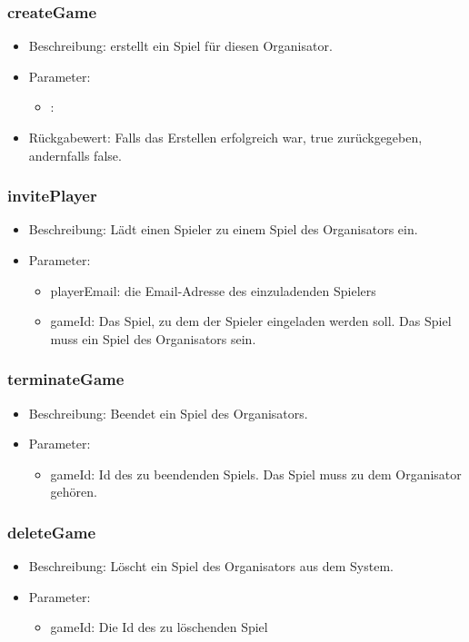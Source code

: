 \documentclass[a4paper]{scrreprt}
\begin{document}
	\subsubsection{createGame}
	\begin{itemize}
		\item Beschreibung: erstellt ein Spiel für diesen Organisator.
		\item Parameter: %
		\begin{itemize}
			\item :
		\end{itemize}
		\item Rückgabewert: Falls das Erstellen erfolgreich war, true zurückgegeben, andernfalls false. 
	\end{itemize}
	\subsubsection{invitePlayer}
	\begin{itemize}
		\item Beschreibung: Lädt einen Spieler zu einem Spiel des Organisators ein.
		\item Parameter:
		\begin{itemize}
			\item playerEmail: die Email-Adresse des einzuladenden Spielers
			\item gameId: Das Spiel, zu dem der Spieler eingeladen werden soll. Das Spiel muss ein Spiel des Organisators sein.
		\end{itemize}
	\end{itemize}
	\subsubsection{terminateGame}
	\begin{itemize}
		\item Beschreibung: Beendet ein Spiel des Organisators. 
		\item Parameter:
		\begin{itemize}
			\item gameId: Id des zu beendenden Spiels. Das Spiel muss zu dem Organisator gehören.
		\end{itemize}
	\end{itemize}
	\subsubsection{deleteGame}
	\begin{itemize}
		\item Beschreibung: Löscht ein Spiel des Organisators aus dem System. 
		\item Parameter:
		\begin{itemize}
			\item gameId: Die Id des zu löschenden Spiel
		\end{itemize}
	\end{itemize}
\end{document}
